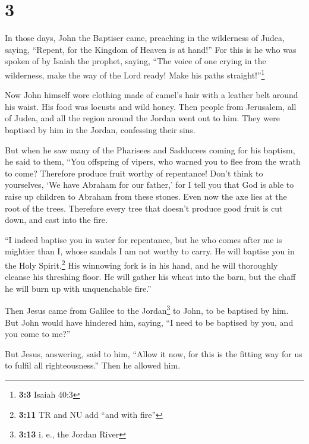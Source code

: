 \hypertarget{section-2}{%
\section{3}\label{section-2}}

 In those days, John the Baptiser came, preaching in the
wilderness of Judea, saying,  ``Repent, for the Kingdom of
Heaven is at hand!''  For this is he who was spoken of by
Isaiah the prophet, saying, ``The voice of one crying in the wilderness,
make the way of the Lord ready! Make his paths straight!''\footnote{\textbf{3:3}
  Isaiah 40:3}

 Now John himself wore clothing made of camel's hair with
a leather belt around his waist. His food was locusts and wild honey.
 Then people from Jerusalem, all of Judea, and all the
region around the Jordan went out to him.  They were
baptised by him in the Jordan, confessing their sins.

 But when he saw many of the Pharisees and Sadducees
coming for his baptism, he said to them, ``You offspring of vipers, who
warned you to flee from the wrath to come?  Therefore
produce fruit worthy of repentance!  Don't think to
yourselves, `We have Abraham for our father,' for I tell you that God is
able to raise up children to Abraham from these stones. 
Even now the axe lies at the root of the trees. Therefore every tree
that doesn't produce good fruit is cut down, and cast into the fire.

 ``I indeed baptise you in water for repentance, but he
who comes after me is mightier than I, whose sandals I am not worthy to
carry. He will baptise you in the Holy Spirit.\footnote{\textbf{3:11} TR
  and NU add ``and with fire''}  His winnowing fork is in
his hand, and he will thoroughly cleanse his threshing floor. He will
gather his wheat into the barn, but the chaff he will burn up with
unquenchable fire.''

 Then Jesus came from Galilee to the Jordan\footnote{\textbf{3:13}
  i. e., the Jordan River} to John, to be baptised by him.
 But John would have hindered him, saying, ``I need to be
baptised by you, and you come to me?''

 But Jesus, answering, said to him, ``Allow it now, for
this is the fitting way for us to fulfil all righteousness.'' Then he
allowed him.

